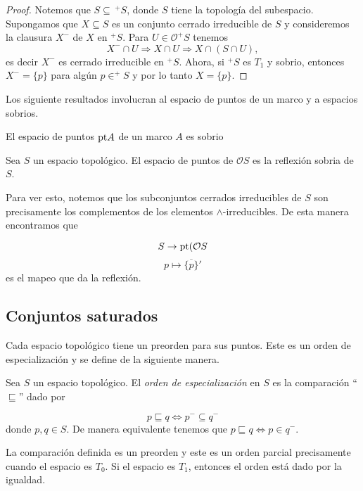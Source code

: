 \begin{proof}
    Notemos que $S\subseteq\, ^+S$, donde $S$ tiene la topología del subespacio. Supongamos que $X\subseteq S$ es un conjunto cerrado irreducible de $S$ y consideremos la clausura $X^-$ de $X$ en $^+S$. Para $U\in \mathcal{O}^+S$ tenemos
    \[
    X^{-}\cap U\Rightarrow X\cap U\Rightarrow X\cap (S\cap U),
    \]
    es decir $X^-$ es cerrado irreducible en $^+S$. Ahora, si $^+S$ es $T_1$ y sobrio, entonces $X^{-}=\{p\}$ para algún $p\in ^+S$ y por lo tanto $X=\{p\}$.
\end{proof}

Los siguiente resultados involucran al espacio de puntos de un marco y a espacios sobrios.
\begin{lem}
    El espacio de puntos $\mathrm{pt} A$ de un marco $A$ es sobrio
\end{lem}

\begin{lem}
    Sea $S$ un espacio topológico. El espacio de puntos de $\mathcal{O}S$ es la reflexión sobria de $S$.
\end{lem}

Para ver esto, notemos que los subconjuntos cerrados irreducibles de $S$ son precisamente los complementos de los elementos $\wedge$-irreducibles. De esta manera encontramos que 

\[
S\to \mathrm{pt}(\mathcal{O}S
\]
\[
p\mapsto \overline{\{p\}}'
\]
es el mapeo que da la reflexión.

\subsection{Conjuntos saturados}\label{Conjuntos saturados}

Cada espacio topológico tiene un preorden para sus puntos. Este es un orden de especialización y se define de la siguiente manera.

\begin{dfn}\label{O. especializacion}
    Sea $S$ un espacio topológico. El \emph{orden de especialización} en $S$ es la comparación ``$\sqsubseteq$'' dado por 

    \[
    p\sqsubseteq q \Leftrightarrow p^- \subseteq q^-
    \]
    donde $p, q\in S$. De manera equivalente tenemos que $ p\sqsubseteq q \Leftrightarrow p\in q^-$.
\end{dfn}

La comparación definida es un preorden y este es un orden parcial precisamente cuando el espacio es $T_0$. Si el espacio es $T_1$, entonces el orden está dado por la igualdad.\\

